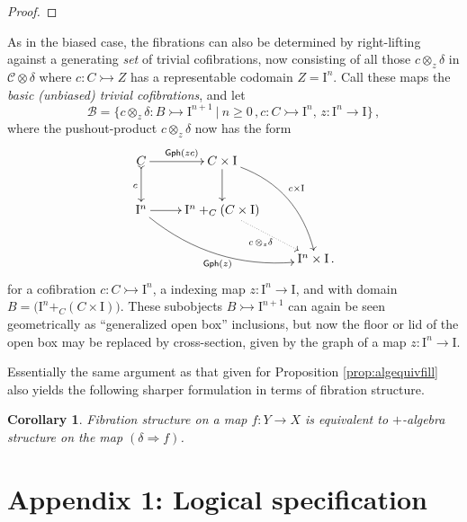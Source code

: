 \documentclass[11pt]{article}
\newcommand{\mono}{\ensuremath{\rightarrowtail}}
\newcommand{\I}{\ensuremath{\mathrm{I}}}
\newtheorem{corollary}[theorem]{Corollary}
\theoremstyle{remark}
\theoremstyle{definition}
\begin{document}
\begin{proof}

\end{proof}

As in the biased case, the fibrations can also be determined by right-lifting against a generating \emph{set} of trivial cofibrations, now consisting of all those $c \otimes_z \delta$ in $\mathcal{C}\otimes \delta$ where $c : C \mono Z$ has a representable codomain $Z=\I^n$.  Call these maps the \emph{basic (unbiased) trivial cofibrations}, and let 
\begin{equation}\label{eq:basicunbiasedtrivcof}
\mathcal{B} = \{c \otimes_z \delta : B \mono \I^{n+1}\ |\ n\geq 0\,, c : C\mono \I^n,\, z : \I^n \to \I\}\,,
\end{equation}
where the pushout-product $c\otimes_z \delta$ now has the form
\begin{equation}\label{diagram:unbiasedbasicpushoutproduct}
\xymatrix{
C \ar@{>->}[d]_{c} \ar[r]^{\mathsf{Gph}(zc)} & C\times \I \ar[d] \ar@/^4ex/ [rdd]^{c\times\I}\\
\I^n \ar@/_4ex/ [rrd]_{\mathsf{Gph}(z)} \ar[r] &  \I^n +_C (C\times\I) \ar@{.>}[rd]_{c\, \otimes_z \delta} \\
&& \I^n\times\I\,.
}
\end{equation}
for a cofibration $c : C\mono \I^n$, a indexing map $z : \I^n \to \I$, and with domain $B = \big(\I^n +_C (C\times\I)\big)$.   These subobjects $B \mono \I^{n+1}$ can again be seen geometrically as ``generalized open box'' inclusions, but now the floor or lid of the open box may be replaced by cross-section, given by the graph of a map $z:\I^n\to \I$.


Essentially the same argument as that given for Proposition \ref{prop:algequivfill} also yields the following sharper formulation in terms of fibration structure.
\begin{corollary}
Fibration structure on a map $f : Y\to X$ is equivalent to $+$-algebra structure on the map $(\delta\Rightarrow{f})$.
\end{corollary}

\section*{Appendix 1: Logical specification}
\end{document}

